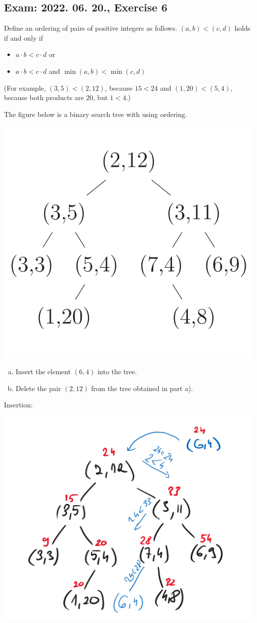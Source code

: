 \subsection{Exam: 2022. 06. 20., Exercise 6}


Define an ordering of pairs of positive integers as follows. $(a,b) < (c,d)$ holds if and only if
\begin{itemize}
\item $a \cdot{} b < c \cdot{} d$ or
\item $a \cdot{} b < c \cdot{} d$ and $\min(a,b) < \min(c,d)$
\end{itemize}

(For example, $(3,5) < (2,12)$, because $15< 24$ and $(1,20) < (5,4)$, because both products are $20$, but $1 < 4$.) 

The figure below is a binary search tree with using ordering.

\begin{center}
\includegraphics[width=0.5\linewidth]{exams/2022_06_20/06/bintree.png}
\end{center}

\begin{enumerate}[a)]
    \item Insert the element $(6,4)$ into the tree.
    \item Delete the pair $(2,12)$ from the tree obtained in part a).
\end{enumerate}


Insertion:

\begin{center}
\includegraphics[width=0.5\linewidth]{exams/2022_06_20/06/insert.png}
\end{center}

